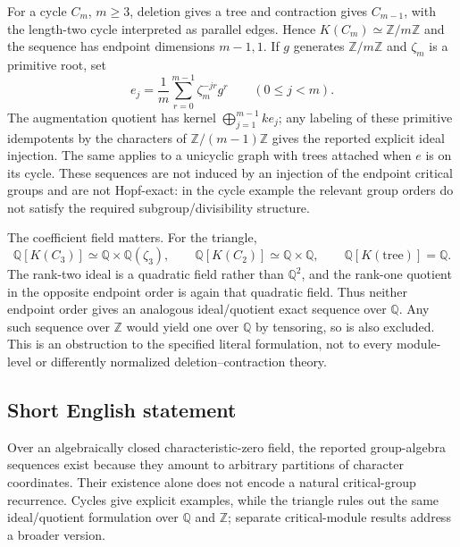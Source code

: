 \documentclass[11pt]{article}
\newcommand{\Z}{\mathbb{Z}}
\newcommand{\Q}{\mathbb{Q}}
\begin{document}
For a cycle \(C_m\), \(m\geq3\), deletion gives a tree and contraction gives \(C_{m-1}\), with the length-two cycle interpreted as parallel edges. Hence \(K(C_m)\simeq\Z/m\Z\) and the sequence has endpoint dimensions \(m-1,1\). If \(g\) generates \(\Z/m\Z\) and \(\zeta_m\) is a primitive root, set
\[
 e_j=\frac1m\sum_{r=0}^{m-1}\zeta_m^{-jr}g^r\qquad(0\leq j<m).
\]
The augmentation quotient has kernel \(\bigoplus_{j=1}^{m-1}ke_j\); any labeling of these primitive idempotents by the characters of \(\Z/(m-1)\Z\) gives the reported explicit ideal injection. The same applies to a unicyclic graph with trees attached when \(e\) is on its cycle. These sequences are not induced by an injection of the endpoint critical groups and are not Hopf-exact: in the cycle example the relevant group orders do not satisfy the required subgroup/divisibility structure.

The coefficient field matters. For the triangle,
\[
 \Q[K(C_3)]\simeq\Q\times\Q(\zeta_3),\qquad
 \Q[K(C_2)]\simeq\Q\times\Q,\qquad \Q[K(\mathrm{tree})]=\Q.
\]
The rank-two ideal is a quadratic field rather than \(\Q^2\), and the rank-one quotient in the opposite endpoint order is again that quadratic field. Thus neither endpoint order gives an analogous ideal/quotient exact sequence over \(\Q\). Any such sequence over \(\Z\) would yield one over \(\Q\) by tensoring, so is also excluded. This is an obstruction to the specified literal formulation, not to every module-level or differently normalized deletion--contraction theory.
\subsection{Short English statement}
Over an algebraically closed characteristic-zero field, the reported group-algebra sequences exist because they amount to arbitrary partitions of character coordinates. Their existence alone does not encode a natural critical-group recurrence. Cycles give explicit examples, while the triangle rules out the same ideal/quotient formulation over \(\Q\) and \(\Z\); separate critical-module results address a broader version.
\end{document}
